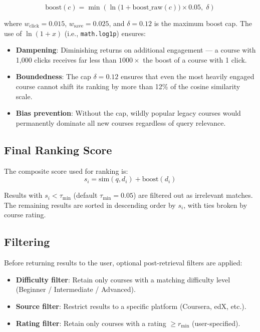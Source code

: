 \documentclass[12pt, a4paper]{article}
\begin{document}
\begin{equation}
    \text{boost}(c) = \min\!\left(\ln\bigl(1 + \text{boost\_raw}(c)\bigr) \times 0.05,\; \delta\right)
    \label{eq:boost}
\end{equation}

where $w_{\text{click}} = 0.015$, $w_{\text{save}} = 0.025$, and $\delta = 0.12$ is the maximum
boost cap. The use of $\ln(1 + x)$ (i.e., \texttt{math.log1p}) ensures:
\begin{itemize}
    \item \textbf{Dampening}: Diminishing returns on additional engagement — a course with 1,000
    clicks receives far less than $1000\times$ the boost of a course with 1 click.
    \item \textbf{Boundedness}: The cap $\delta = 0.12$ ensures that even the most heavily engaged
    course cannot shift its ranking by more than 12\% of the cosine similarity scale.
    \item \textbf{Bias prevention}: Without the cap, wildly popular legacy courses would permanently
    dominate all new courses regardless of query relevance.
\end{itemize}

\subsection{Final Ranking Score}

The composite score used for ranking is:
\begin{equation}
    s_i = \text{sim}(q, d_i) + \text{boost}(d_i)
    \label{eq:finalscore}
\end{equation}

Results with $s_i < \tau_{\min}$ (default $\tau_{\min} = 0.05$) are filtered out as irrelevant
matches. The remaining results are sorted in descending order by $s_i$, with ties broken by
course rating.

\subsection{Filtering}

Before returning results to the user, optional post-retrieval filters are applied:
\begin{itemize}
    \item \textbf{Difficulty filter}: Retain only courses with a matching difficulty level
    (Beginner / Intermediate / Advanced).
    \item \textbf{Source filter}: Restrict results to a specific platform (Coursera, edX, etc.).
    \item \textbf{Rating filter}: Retain only courses with a rating $\geq r_{\min}$ (user-specified).
\end{itemize}
\end{document}
